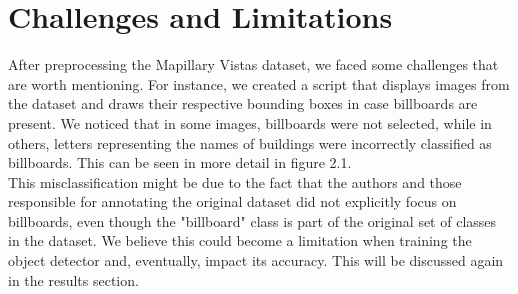 \section{Challenges and Limitations}\label{sec:challenges}

After preprocessing the Mapillary Vistas dataset, we faced some challenges that are worth mentioning. For instance, we created a script that displays images from the dataset and draws their respective bounding boxes in case billboards are present. We noticed that in some images, billboards were not selected, while in others, letters representing the names of buildings were incorrectly classified as billboards. This can be seen in more detail in figure 2.1.\\

This misclassification might be due to the fact that the authors and those responsible for annotating the original dataset did not explicitly focus on billboards, even though the "billboard" class is part of the original set of classes in the dataset. We believe this could become a limitation when training the object detector and, eventually, impact its accuracy. This will be discussed again in the results section.

